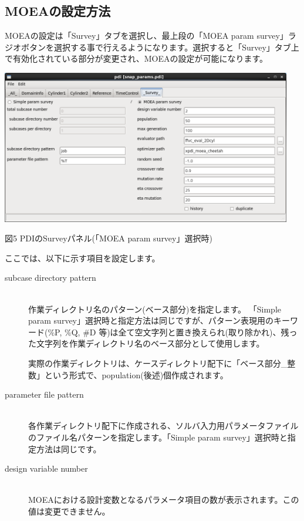 \documentclass[a4paper,11pt]{jarticle}
\begin{document}
{\subsection{MOEAの設定方法}

MOEAの設定は「Survey」タブを選択し、最上段の「MOEA param survey」ラジオボタンを選択する事で行えるようになります。選択すると「Survey」タブ上で有効化されている部分が変更され、MOEAの設定が可能になります。

\begin{center}
\includegraphics[width=360pt, bb=0 0 984 520]{figs/fig005.png}

図5 PDIのSurveyパネル(「MOEA param survey」選択時)
\end{center}

ここでは、以下に示す項目を設定します。

\begin{description}
\item[subcase directory pattern] {\ }\\
作業ディレクトリ名のパターン(ベース部分)を指定します。
「Simple param survey」選択時と指定方法は同じですが、パターン表現用のキーワード(\%P, \%Q, \#D 等)は全て空文字列と置き換えられ(取り除かれ)、残った文字列を作業ディレクトリ名のベース部分として使用します。

実際の作業ディレクトリは、ケースディレクトリ配下に「ベース部分\_整数」という形式で、population(後述)個作成されます。\\

\item[parameter file pattern] {\ }\\
各作業ディレクトリ配下に作成される、ソルバ入力用パラメータファイルのファイル名パターンを指定します。「Simple param survey」選択時と指定方法は同じです。\\

\item[design variable number] {\ }\\
MOEAにおける設計変数となるパラメータ項目の数が表示されます。この値は変更できません。


\end{description}}
\end{document}
